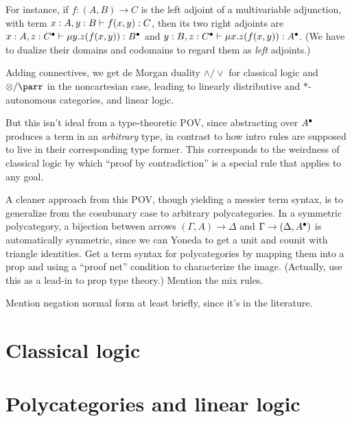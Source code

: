 For instance, if $f:(A,B)\to C$ is the left adjoint of a multivariable adjunction, with term $x:A, y:B \vdash f(x,y):C$, then its two right adjoints are $x:A, z:C^\bullet \vdash \mu y. z(f(x,y)) :B^\bullet$ and $y:B, z:C^\bullet \vdash \mu x. z(f(x,y)):A^\bullet$.
(We have to dualize their domains and codomains to regard them as \emph{left} adjoints.)

Adding connectives, we get de Morgan duality $\land/\lor$ for classical logic and $\otimes/\parr$ in the noncartesian case, leading to linearly distributive and $\ast$-autonomous categories, and linear logic.

But this isn't ideal from a type-theoretic POV, since abstracting over $A^\bullet$ produces a term in an \emph{arbitrary} type, in contrast to how intro rules are supposed to live in their corresponding type former.
This corresponds to the weirdness of classical logic by which ``proof by contradiction'' is a special rule that applies to any goal.

A cleaner approach from this POV, though yielding a messier term syntax, is to generalize from the cosubunary case to arbitrary polycategories.
In a symmetric polycategory, a bijection between arrows $(\Gamma,A) \to \Delta$ and $\Gamma \to (\Delta,A^\bullet)$ is automatically symmetric, since we can Yoneda to get a unit and counit with triangle identities.
Get a term syntax for polycategories by mapping them into a prop and using a ``proof net'' condition to characterize the image.
(Actually, use this as a lead-in to prop type theory.)
Mention the mix rules.

Mention negation normal form at least briefly, since it's in the literature.


\section{Classical logic}
\label{sec:classical}



\section{Polycategories and linear logic}
\label{sec:cllin}




